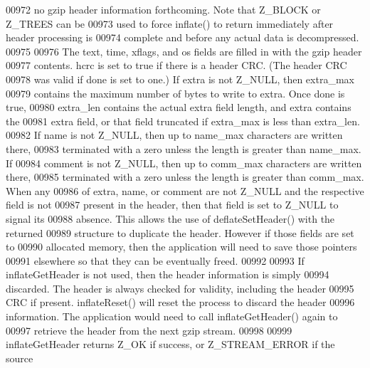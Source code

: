 \begin{DoxyCode}
00972 \textcolor{comment}{   no gzip header information forthcoming.  Note that Z\_BLOCK or Z\_TREES can be}
00973 \textcolor{comment}{   used to force inflate() to return immediately after header processing is}
00974 \textcolor{comment}{   complete and before any actual data is decompressed.}
00975 \textcolor{comment}{}
00976 \textcolor{comment}{     The text, time, xflags, and os fields are filled in with the gzip header}
00977 \textcolor{comment}{   contents.  hcrc is set to true if there is a header CRC.  (The header CRC}
00978 \textcolor{comment}{   was valid if done is set to one.) If extra is not Z\_NULL, then extra\_max}
00979 \textcolor{comment}{   contains the maximum number of bytes to write to extra.  Once done is true,}
00980 \textcolor{comment}{   extra\_len contains the actual extra field length, and extra contains the}
00981 \textcolor{comment}{   extra field, or that field truncated if extra\_max is less than extra\_len.}
00982 \textcolor{comment}{   If name is not Z\_NULL, then up to name\_max characters are written there,}
00983 \textcolor{comment}{   terminated with a zero unless the length is greater than name\_max.  If}
00984 \textcolor{comment}{   comment is not Z\_NULL, then up to comm\_max characters are written there,}
00985 \textcolor{comment}{   terminated with a zero unless the length is greater than comm\_max.  When any}
00986 \textcolor{comment}{   of extra, name, or comment are not Z\_NULL and the respective field is not}
00987 \textcolor{comment}{   present in the header, then that field is set to Z\_NULL to signal its}
00988 \textcolor{comment}{   absence.  This allows the use of deflateSetHeader() with the returned}
00989 \textcolor{comment}{   structure to duplicate the header.  However if those fields are set to}
00990 \textcolor{comment}{   allocated memory, then the application will need to save those pointers}
00991 \textcolor{comment}{   elsewhere so that they can be eventually freed.}
00992 \textcolor{comment}{}
00993 \textcolor{comment}{     If inflateGetHeader is not used, then the header information is simply}
00994 \textcolor{comment}{   discarded.  The header is always checked for validity, including the header}
00995 \textcolor{comment}{   CRC if present.  inflateReset() will reset the process to discard the header}
00996 \textcolor{comment}{   information.  The application would need to call inflateGetHeader() again to}
00997 \textcolor{comment}{   retrieve the header from the next gzip stream.}
00998 \textcolor{comment}{}
00999 \textcolor{comment}{     inflateGetHeader returns Z\_OK if success, or Z\_STREAM\_ERROR if the source}

\end{DoxyCode}
